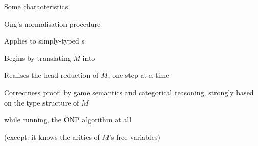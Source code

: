 \documentclass[12pt,fleqn,landscape]{article}
\begin{document}

\begin{slide}{Some characteristics}



Ong's normalisation procedure 
\vair

\bi

\item Applies to simply-typed {\lexp}s \hfill {}
\vair

\item Begins by translating $M$ into 
\vair

\item Realises the head reduction of $M$, one step at a time
\vair

\item Correctness proof:  by game semantics and categorical reasoning,
strongly based on the type structure of $M$ \ei
\vair

\vair\vair

while running, the ONP algorithm   at all
\vair\vair


\hfill (except: it knows the arities of $M$'s free variables)
\vair\vair\vair

\bc {}
\ec

\end{slide}


\end{document}
